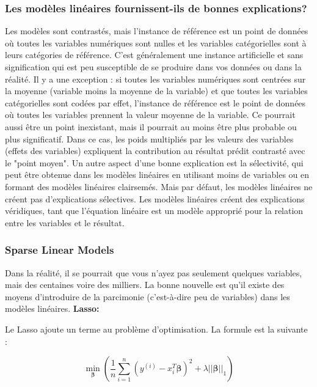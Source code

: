 \subsubsection{Les modèles linéaires fournissent-ils de bonnes explications?}

Les modèles sont contrastés, mais l'instance de référence est un point de données où toutes les variables numériques sont nulles et les variables catégorielles sont à leurs catégories de référence. C'est généralement une instance artificielle et sans signification qui est peu susceptible de se produire dans vos données ou dans la réalité. Il y a une exception : si toutes les variables numériques sont centrées sur la moyenne (variable moins la moyenne de la variable) et que toutes les variables catégorielles sont codées par effet, l'instance de référence est le point de données où toutes les variables prennent la valeur moyenne de la variable. Ce pourrait aussi être un point inexistant, mais il pourrait au moins être plus probable ou plus significatif. Dans ce cas, les poids multipliés par les valeurs des variables (effets des variables) expliquent la contribution au résultat prédit contrasté avec le "point moyen". Un autre aspect d'une bonne explication est la sélectivité, qui peut être obtenue dans les modèles linéaires en utilisant moins de variables ou en formant des modèles linéaires clairsemés. Mais par défaut, les modèles linéaires ne créent pas d'explications sélectives. Les modèles linéaires créent des explications véridiques, tant que l'équation linéaire est un modèle approprié pour la relation entre les variables et le résultat.

\subsubsection{Sparse Linear Models}

Dans la réalité, il se pourrait que vous n'ayez pas seulement quelques variables, mais des centaines voire des milliers. La bonne nouvelle est qu'il existe des moyens d'introduire de la parcimonie (c'est-à-dire peu de variables) dans les modèles linéaires.
\newline
\textbf{Lasso:}
\newline

Le Lasso ajoute un terme au problème d'optimisation. La formule est la suivante :

\[
\min_{\boldsymbol{\beta}}\left(\frac{1}{n}\sum_{i=1}^n(y^{(i)}-x_{i}^T\boldsymbol{\beta})^2+\lambda||\boldsymbol{\beta}||_1\right)
\]

